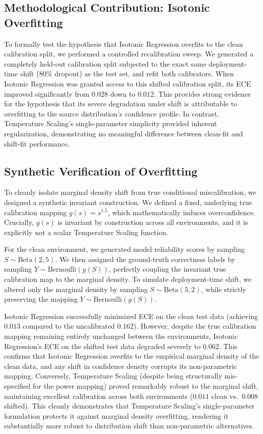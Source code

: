 \documentclass{jmlr} %
\begin{document}
\subsection{Methodological Contribution: Isotonic Overfitting}
To formally test the hypothesis that Isotonic Regression overfits to the clean calibration split, we performed a controlled recalibration sweep. We generated a completely held-out calibration split subjected to the exact same deployment-time shift (80\% dropout) as the test set, and refit both calibrators. When Isotonic Regression was granted access to this shifted calibration split, its ECE improved significantly from $0.028$ down to $0.012$. This provides strong evidence for the hypothesis that its severe degradation under shift is attributable to overfitting to the source distribution's confidence profile. In contrast, Temperature Scaling's single-parameter simplicity provided inherent regularization, demonstrating no meaningful difference between clean-fit and shift-fit performance.






\subsection{Synthetic Verification of Overfitting}
\label{sec:synthetic}
To cleanly isolate marginal density shift from true conditional miscalibration, we designed a synthetic invariant construction. We defined a fixed, underlying true calibration mapping $g(s) = s^{1.5}$, which mathematically induces overconfidence. Crucially, $g(s)$ is invariant by construction across all environments, and it is explicitly not a scalar Temperature Scaling function. 

For the clean environment, we generated model reliability scores by sampling $S \sim \text{Beta}(2, 5)$. We then assigned the ground-truth correctness labels by sampling $Y \sim \text{Bernoulli}(g(S))$, perfectly coupling the invariant true calibration map to the marginal density. To simulate deployment-time shift, we altered only the marginal density by sampling $S \sim \text{Beta}(5, 2)$, while strictly preserving the mapping $Y \sim \text{Bernoulli}(g(S))$. 

Isotonic Regression successfully minimized ECE on the clean test data (achieving $0.013$ compared to the uncalibrated $0.162$). However, despite the true calibration mapping remaining entirely unchanged between the environments, Isotonic Regression's ECE on the shifted test data degraded severely to $0.062$. This confirms that Isotonic Regression overfits to the empirical marginal density of the clean data, and any shift in confidence density corrupts its non-parametric mapping. Conversely, Temperature Scaling (despite being structurally mis-specified for the power mapping) proved remarkably robust to the marginal shift, maintaining excellent calibration across both environments ($0.011$ clean vs.\ $0.008$ shifted). This cleanly demonstrates that Temperature Scaling's single-parameter formulation protects it against marginal density overfitting, rendering it substantially more robust to distribution shift than non-parametric alternatives.
\end{document}
